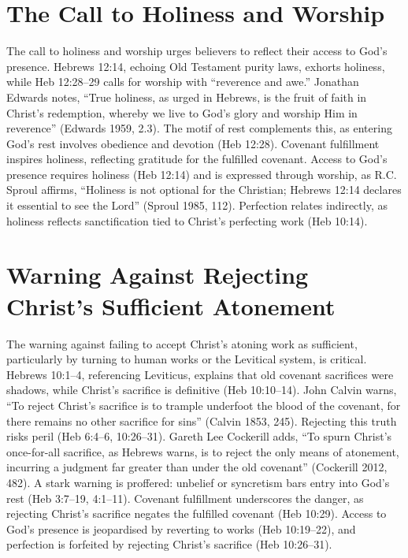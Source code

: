 \documentclass[12pt]{article}
\begin{document}
\section{The Call to Holiness and Worship}
The call to holiness and worship urges believers to reflect their access to
God’s presence. Hebrews 12:14, echoing Old Testament purity laws, exhorts
holiness, while Heb 12:28--29 calls for worship with ``reverence and awe.''
Jonathan Edwards notes, ``True holiness, as urged in Hebrews, is the fruit of
faith in Christ’s redemption, whereby we live to God’s glory and worship Him in
reverence'' (Edwards 1959, 2.3). The motif of rest complements this, as
entering God’s rest involves obedience and devotion (Heb 12:28). Covenant
fulfillment inspires holiness, reflecting gratitude for the fulfilled covenant.
Access to God’s presence requires holiness (Heb 12:14) and is expressed through
worship, as R.C. Sproul affirms, ``Holiness is not optional for the Christian;
Hebrews 12:14 declares it essential to see the Lord'' (Sproul 1985, 112).
Perfection relates indirectly, as holiness reflects sanctification tied to
Christ’s perfecting work (Heb 10:14).

\section{Warning Against Rejecting Christ’s Sufficient Atonement}
The warning against failing to accept Christ’s atoning work as sufficient,
particularly by turning to human works or the Levitical system, is critical.
Hebrews 10:1--4, referencing Leviticus, explains that old covenant sacrifices
were shadows, while Christ’s sacrifice is definitive (Heb 10:10--14). John
Calvin warns, ``To reject Christ’s sacrifice is to trample underfoot the blood
of the covenant, for there remains no other sacrifice for sins'' (Calvin 1853,
245). Rejecting this truth risks peril (Heb 6:4--6, 10:26--31). Gareth Lee
Cockerill adds, ``To spurn Christ’s once-for-all sacrifice, as Hebrews warns,
is to reject the only means of atonement, incurring a judgment far greater than
under the old covenant'' (Cockerill 2012, 482). A stark warning is proffered:
unbelief or syncretism bars entry into God’s rest (Heb 3:7--19, 4:1--11).
Covenant fulfillment underscores the danger, as rejecting Christ’s sacrifice
negates the fulfilled covenant (Heb 10:29). Access to God’s presence is
jeopardised by reverting to works (Heb 10:19--22), and perfection is forfeited
by rejecting Christ’s sacrifice (Heb 10:26--31).
\end{document}

